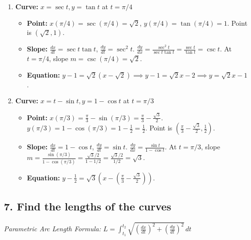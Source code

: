 \documentclass[12pt]{article}
\newcommand{\questiontitle}[1]{\subsection*{#1}}
\begin{document}
\begin{enumerate}[label=\alph*.]
    \item \textbf{Curve:} $x=\sec t, y=\tan t$ at $t=\pi/4$
    \begin{itemize}
        \item \textbf{Point:} $x(\pi/4)=\sec(\pi/4)=\sqrt{2}$, $y(\pi/4)=\tan(\pi/4)=1$. Point is $(\sqrt{2}, 1)$.
        \item \textbf{Slope:} $\frac{dx}{dt}=\sec t \tan t$, $\frac{dy}{dt}=\sec^2 t$.
        $\frac{dy}{dx} = \frac{\sec^2 t}{\sec t \tan t} = \frac{\sec t}{\tan t} = \csc t$.
        At $t=\pi/4$, slope $m = \csc(\pi/4)=\sqrt{2}$.
        \item \textbf{Equation:} $y-1 = \sqrt{2}(x-\sqrt{2}) \implies y-1 = \sqrt{2}x - 2 \implies y = \sqrt{2}x - 1$.
    \end{itemize}

    \item \textbf{Curve:} $x=t-\sin t, y=1-\cos t$ at $t=\pi/3$
    \begin{itemize}
        \item \textbf{Point:} $x(\pi/3)=\frac{\pi}{3}-\sin(\pi/3)=\frac{\pi}{3}-\frac{\sqrt{3}}{2}$.
        $y(\pi/3)=1-\cos(\pi/3)=1-\frac{1}{2}=\frac{1}{2}$. Point is $(\frac{\pi}{3}-\frac{\sqrt{3}}{2}, \frac{1}{2})$.
        \item \textbf{Slope:} $\frac{dx}{dt}=1-\cos t$, $\frac{dy}{dt}=\sin t$.
        $\frac{dy}{dx} = \frac{\sin t}{1-\cos t}$.
        At $t=\pi/3$, slope $m = \frac{\sin(\pi/3)}{1-\cos(\pi/3)} = \frac{\sqrt{3}/2}{1-1/2} = \frac{\sqrt{3}/2}{1/2} = \sqrt{3}$.
        \item \textbf{Equation:} $y - \frac{1}{2} = \sqrt{3}\left(x - \left(\frac{\pi}{3}-\frac{\sqrt{3}}{2}\right)\right)$.
    \end{itemize}
\end{enumerate}

\newpage
\questiontitle{7. Find the lengths of the curves}

\textit{Parametric Arc Length Formula:} $L = \displaystyle \int_{t_1}^{t_2} \sqrt{(\frac{dx}{dt})^2 + (\frac{dy}{dt})^2} \,dt$
\end{document}
